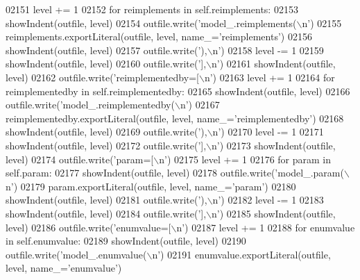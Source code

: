 \begin{DoxyCode}
{{{{{{{{{{{{{{{{{{{{{{{{{{{{{{{{{{{{{{{{{{{{{{{{{{{{{{{{{{{{{{{{{{{{{{{{{{{{{{{{{{{{{{{{{{{{{{{{{{{{{{{{{{{{{{{{{{{{{{{{{{{{{{{{{{{{{{{{{{{{{{{{{{{{{{{{{{{{{{{{{{{{{{{{{{02151         level += 1
02152         \textcolor{keywordflow}{for} reimplements \textcolor{keywordflow}{in} self.reimplements:
02153             showIndent(outfile, level)
02154             outfile.write(\textcolor{stringliteral}{'model\_.reimplements(\(\backslash\)n'})
02155             reimplements.exportLiteral(outfile, level, name\_=\textcolor{stringliteral}{'reimplements'})
02156             showIndent(outfile, level)
02157             outfile.write(\textcolor{stringliteral}{'),\(\backslash\)n'})
02158         level -= 1
02159         showIndent(outfile, level)
02160         outfile.write(\textcolor{stringliteral}{'],\(\backslash\)n'})
02161         showIndent(outfile, level)
02162         outfile.write(\textcolor{stringliteral}{'reimplementedby=[\(\backslash\)n'})
02163         level += 1
02164         \textcolor{keywordflow}{for} reimplementedby \textcolor{keywordflow}{in} self.reimplementedby:
02165             showIndent(outfile, level)
02166             outfile.write(\textcolor{stringliteral}{'model\_.reimplementedby(\(\backslash\)n'})
02167             reimplementedby.exportLiteral(outfile, level, name\_=\textcolor{stringliteral}{'reimplementedby'})
02168             showIndent(outfile, level)
02169             outfile.write(\textcolor{stringliteral}{'),\(\backslash\)n'})
02170         level -= 1
02171         showIndent(outfile, level)
02172         outfile.write(\textcolor{stringliteral}{'],\(\backslash\)n'})
02173         showIndent(outfile, level)
02174         outfile.write(\textcolor{stringliteral}{'param=[\(\backslash\)n'})
02175         level += 1
02176         \textcolor{keywordflow}{for} param \textcolor{keywordflow}{in} self.param:
02177             showIndent(outfile, level)
02178             outfile.write(\textcolor{stringliteral}{'model\_.param(\(\backslash\)n'})
02179             param.exportLiteral(outfile, level, name\_=\textcolor{stringliteral}{'param'})
02180             showIndent(outfile, level)
02181             outfile.write(\textcolor{stringliteral}{'),\(\backslash\)n'})
02182         level -= 1
02183         showIndent(outfile, level)
02184         outfile.write(\textcolor{stringliteral}{'],\(\backslash\)n'})
02185         showIndent(outfile, level)
02186         outfile.write(\textcolor{stringliteral}{'enumvalue=[\(\backslash\)n'})
02187         level += 1
02188         \textcolor{keywordflow}{for} enumvalue \textcolor{keywordflow}{in} self.enumvalue:
02189             showIndent(outfile, level)
02190             outfile.write(\textcolor{stringliteral}{'model\_.enumvalue(\(\backslash\)n'})
02191             enumvalue.exportLiteral(outfile, level, name\_=\textcolor{stringliteral}{'enumvalue'})
}}}}}}}}}}}}}}}}}}}}}}}}}}}}}}}}}}}}}}}}}}}}}}}}}}}}}}}}}}}}}}}}}}}}}}}}}}}}}}}}}}}}}}}}}}}}}}}}}}}}}}}}}}}}}}}}}}}}}}}}}}}}}}}}}}}}}}}}}}}}}}}}}}}}}}}}}}}}}}}}}}}}}}}}}}
\end{DoxyCode}

